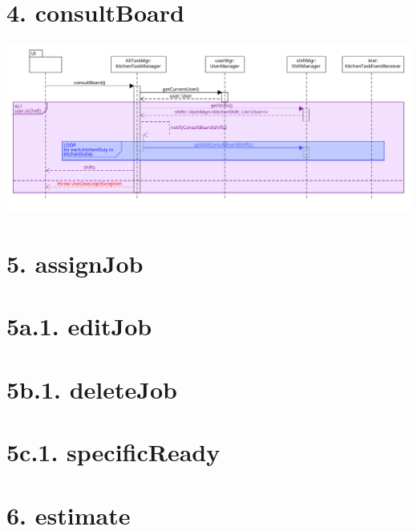\pagebreak

\section*{4. consultBoard}

\begin{center}
  \includegraphics[scale = 0.38]{images/DSD/DSD 4.png}
\end{center}

\pagebreak

\section*{5. assignJob}

\pagebreak

\section*{5a.1. editJob}

\pagebreak

\section*{5b.1. deleteJob}

\pagebreak

\section*{5c.1. specificReady}

\pagebreak

\section*{6. estimate}

\pagebreak
